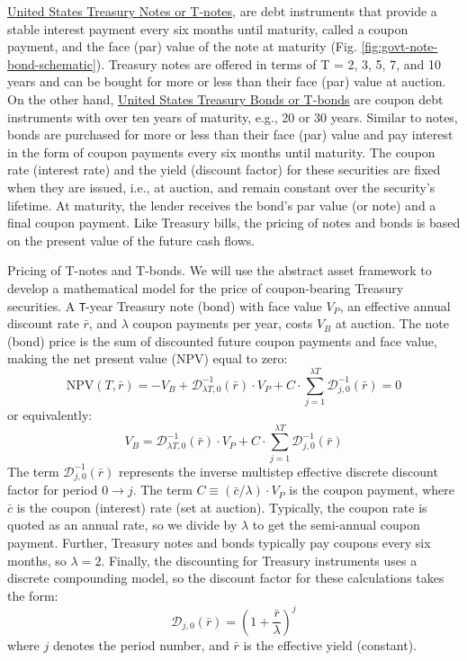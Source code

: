 \documentclass[11pt]{article}
\makeatletter
\theoremstyle{definition}
\renewcommand\subsubsection{\@startsection
	{subsubsection}{2}{0mm}
	{-0.05in}
	{-0.5\baselineskip}
	{\normalfont\normalsize\itshape\bfseries}}
\makeatother
\begin{document}
\href{https://treasurydirect.gov/marketable-securities/treasury-notes/}{United States Treasury Notes or T-notes}, 
are debt instruments that provide a stable interest payment every six months until maturity, called a coupon payment, and the face (par) value of the note at maturity (Fig. \ref{fig:govt-note-bond-schematic}).
Treasury notes are offered in terms of T = 2, 3, 5, 7, and 10 years and can be bought for more or less than their face (par) value at auction.
On the other hand,  \href{https://treasurydirect.gov/marketable-securities/treasury-bonds/}{United States Treasury Bonds or T-bonds} 
are coupon debt instruments with over ten years of maturity, e.g., 20 or 30 years. Similar to notes, bonds are purchased for more or less than their face (par) value and pay interest in the form of coupon payments every six months until maturity.
The coupon rate (interest rate) and the yield (discount factor) for these securities are fixed when they are issued, i.e., at auction, and remain constant over the security's lifetime.
At maturity, the lender receives the bond's par value (or note) and a final coupon payment. 
Like Treasury bills, the pricing of notes and bonds is based on the present value of the future cash flows. 

\subsubsection{Pricing of T-notes and T-bonds.}
We will use the abstract asset framework to develop a mathematical model for the price of coupon-bearing Treasury securities.
A \texttt{T}-year Treasury note (bond) with face value $V_{P}$, an effective annual discount rate $\bar{r}$, and $\lambda$ coupon payments per year, costs $V_{B}$ at auction.
The note (bond) price is the sum of discounted future coupon payments and face value, making the net present value (NPV) equal to zero:
\begin{equation}
\text{NPV}(T,\bar{r}) = -V_{B} + \mathcal{D}^{-1}_{\lambda{T},0}(\bar{r})\cdot{V_{P}}+C\cdot\sum_{j=1}^{\lambda{T}}\mathcal{D}_{j,0}^{-1}(\bar{r}) = 0
\end{equation}
or equivalently:
\begin{equation}
V_{B} = \mathcal{D}^{-1}_{\lambda{T},0}(\bar{r})\cdot{V_{P}}+C\cdot\sum_{j=1}^{\lambda{T}}\mathcal{D}_{j,0}^{-1}(\bar{r})
\end{equation}
The term $\mathcal{D}_{j,0}^{-1}(\bar{r})$ represents the inverse multistep effective discrete discount factor for period $0\rightarrow{j}$. 
The term $C\equiv(\bar{c}/\lambda)\cdot{V_{P}}$ is the coupon payment, where $\bar{c}$ is the coupon (interest) rate (set at auction).
Typically, the coupon rate is quoted as an annual rate, so we divide by $\lambda$ to get the semi-annual coupon payment.
Further, Treasury notes and bonds typically pay coupons every six months, so $\lambda=2$.
Finally, the discounting for Treasury instruments uses a discrete compounding model, so the discount factor for these calculations takes the form:
\begin{equation}
\mathcal{D}_{j,0}(\bar{r}) = \left(1+\frac{\bar{r}}{\lambda}\right)^{j}
\end{equation}
where $j$ denotes the period number, and $\bar{r}$ is the effective yield (constant).
\end{document}
